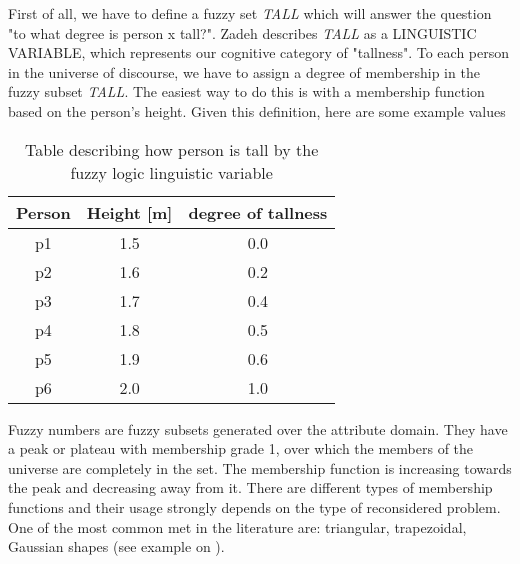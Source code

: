 First of all, we have to define a fuzzy set \textit{TALL} which will answer the question 
"to what degree is person x tall?". Zadeh describes \textit{TALL} as a LINGUISTIC VARIABLE, 
which represents our cognitive category of "tallness". To each person in the universe of discourse, 
we have to assign a degree of membership in the fuzzy subset \textit{TALL}. The easiest way to do this
is with a membership function based on the person's height. Given this definition, here are some example values
\begin{table}[H]
    \centering
    \caption{Table describing how person is tall by the fuzzy logic linguistic
    variable}
    \begin{tabular}{|c|c|c|}
        \hline
        Person & Height [m] & degree of tallness \\ \hline \hline
        p1 & 1.5 & 0.0 \\ \hline
        p2 & 1.6 & 0.2 \\ \hline
        p3 & 1.7 & 0.4 \\ \hline
        p4 & 1.8 & 0.5 \\ \hline
        p5 & 1.9 & 0.6 \\ \hline
        p6 & 2.0 & 1.0 \\ \hline
    \end{tabular}
    \label{tab:fuzzy_logic_example}
\end{table}

Fuzzy numbers are fuzzy subsets generated over the attribute domain. 
They have a peak or plateau with membership grade 1, over which the 
members of the universe are completely in the set.  The membership 
function is increasing towards the peak and decreasing away from it. 
There are different types of membership functions and their usage 
strongly depends on the type of reconsidered problem. One of the most 
common met in the literature are: triangular, trapezoidal, Gaussian shapes
(see example on ).

